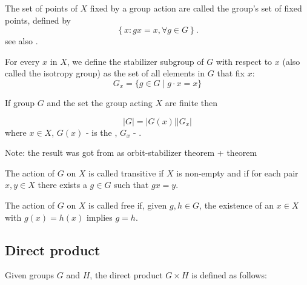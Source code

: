 \begin{appendices}
\begin{definition}
  The set of points of $X$ fixed by a group action are called the
  group's set of fixed points, defined by
  \[
  \left\{
  x: g x = x, \forall g \in G
  \right\}.
  \]
  see also \cite{mathworld:groupfixedpoint}. 
  \label{def:fixedpoint}
\end{definition}

\begin{definition}
  For every $x$ in $X$, we define \cite{wiki:groupaction} the
  stabilizer subgroup of $G$ with 
  respect to $x$ (also called the isotropy group) as the set of all
  elements in $G$ that fix $x$: 
  \[
  G_{x}=\{g\in G\mid g\cdot x=x\}
  \]
  \label{def:stabilizersubgroup}
\end{definition}

\begin{theorem}
  If group $G$ and the set the group acting $X$ are finite then

  \[
  \left|G\right| = \left|G\left(x\right)\right|\left|G_x\right|
  \]
  where $x \in X$, $G\left(x\right)$ - is the ,
  $G_x$ - .
  
  Note: the result was got from \cite{wiki:groupaction} as
  orbit-stabilizer theorem +  theorem
  \label{thm:orbitstabilizertheorem}
\end{theorem}

\begin{definition}
  The action of $G$ on $X$ is called \cite{wiki:groupaction}
  transitive if $X$ is non-empty and if for each pair $x, y \in X$ there
  exists a $g \in G$ such that $gx = y$.
  \label{def:transitive}
\end{definition}

\begin{definition}
  The action of $G$ on $X$ is called \cite{wiki:groupaction}
  free if, given $g, h \in G$, the existence of an $x \in X$ with $g(x)
  = h(x)$ implies $g = h$.
  \label{def:freeaction}
\end{definition}

\subsection{Direct product}

\begin{definition}
  Given groups $G$ and $H$, the direct product $G \times H$ is defined as follows:


\end{definition}
\end{appendices}
